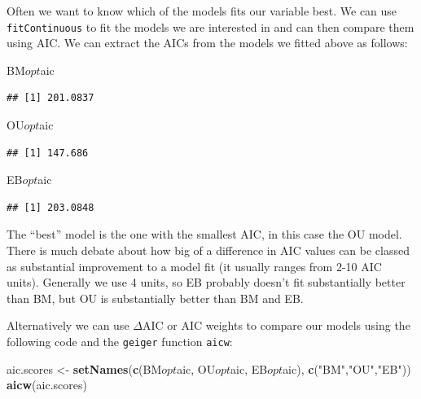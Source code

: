 \documentclass[]{book}
\newenvironment{Shaded}{\begin{snugshade}}{\end{snugshade}}
\newcommand{\KeywordTok}[1]{\textcolor[rgb]{0.13,0.29,0.53}{\textbf{{#1}}}}
\newcommand{\StringTok}[1]{\textcolor[rgb]{0.31,0.60,0.02}{{#1}}}
\newcommand{\NormalTok}[1]{{#1}}
\begin{document}
Often we want to know which of the models fits our variable best. We can
use \texttt{fitContinuous} to fit the models we are interested in and
can then compare them using AIC. We can extract the AICs from the models
we fitted above as follows:

\begin{Shaded}
\begin{Highlighting}[]
\NormalTok{BM$opt$aic}
\end{Highlighting}
\end{Shaded}

\begin{verbatim}
## [1] 201.0837
\end{verbatim}

\begin{Shaded}
\begin{Highlighting}[]
\NormalTok{OU$opt$aic}
\end{Highlighting}
\end{Shaded}

\begin{verbatim}
## [1] 147.686
\end{verbatim}

\begin{Shaded}
\begin{Highlighting}[]
\NormalTok{EB$opt$aic}
\end{Highlighting}
\end{Shaded}

\begin{verbatim}
## [1] 203.0848
\end{verbatim}

The ``best'' model is the one with the smallest AIC, in this case the OU
model. There is much debate about how big of a difference in AIC values
can be classed as substantial improvement to a model fit (it usually
ranges from 2-10 AIC units). Generally we use 4 units, so EB probably
doesn't fit substantially better than BM, but OU is substantially better
than BM and EB.

Alternatively we can use \(\Delta\)AIC or AIC weights to compare our
models using the following code and the \texttt{geiger} function
\texttt{aicw}:

\begin{Shaded}
\begin{Highlighting}[]
\NormalTok{aic.scores <-}\StringTok{ }\KeywordTok{setNames}\NormalTok{(}\KeywordTok{c}\NormalTok{(BM$opt$aic, OU$opt$aic, EB$opt$aic), }\KeywordTok{c}\NormalTok{(}\StringTok{"BM"}\NormalTok{,}\StringTok{"OU"}\NormalTok{,}\StringTok{"EB"}\NormalTok{))}
\KeywordTok{aicw}\NormalTok{(aic.scores)}
\end{Highlighting}
\end{Shaded}
\end{document}
